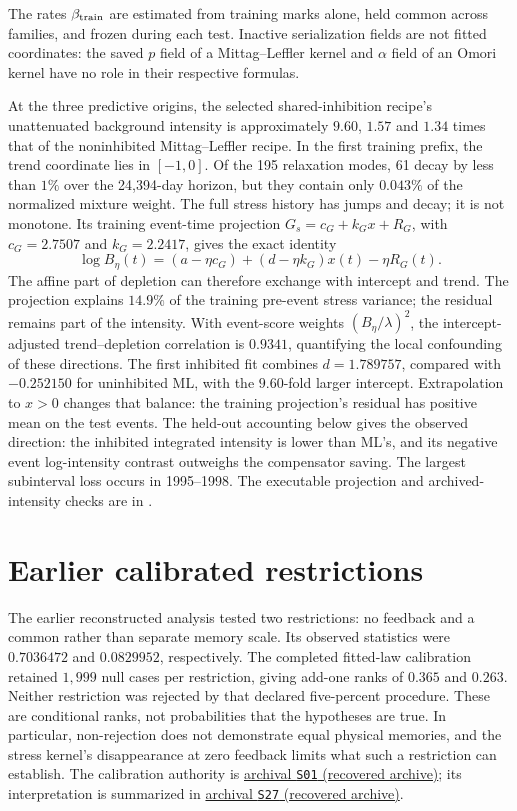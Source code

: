 The rates \(\beta_{\rm train}\) are estimated from training marks alone, held common across families, and frozen during each test. Inactive serialization fields are not fitted coordinates: the saved \(p\) field of a Mittag--Leffler kernel and \(\alpha\) field of an Omori kernel have no role in their respective formulas. 

At the three predictive origins, the selected shared-inhibition recipe's
unattenuated background intensity is approximately \(9.60\), \(1.57\)
and \(1.34\) times that of the noninhibited Mittag--Leffler recipe.
In the first training prefix, the trend coordinate lies in \([-1,0]\).
Of the 195 relaxation modes, 61 decay by less than \(1\%\) over the
24,394-day horizon, but they contain only \(0.043\%\) of the normalized
mixture weight. The full stress history has jumps and decay; it is not monotone.
Its training event-time projection \(G_s=c_G+k_Gx+R_G\), with
\(c_G=2.7507\) and \(k_G=2.2417\), gives the exact identity
\[
 \log B_\eta(t)=(a-\eta c_G)+(d-\eta k_G)x(t)-\eta R_G(t).
\]
The affine part of depletion can therefore exchange with intercept and trend.
The projection explains \(14.9\%\) of the training pre-event stress variance;
the residual remains part of the intensity. With event-score weights
\((B_\eta/\lambda)^2\), the intercept-adjusted trend--depletion correlation
is \(0.9341\), quantifying the local confounding of these directions.
The first inhibited fit combines
\(d=1.789757\), compared with \(-0.252150\) for uninhibited ML, with the
\(9.60\)-fold larger intercept. Extrapolation to \(x>0\) changes that balance:
the training projection's residual has positive mean on the test events.
The held-out accounting below gives the observed direction: the inhibited
integrated intensity is lower than ML's, and its negative event log-intensity
contrast outweighs the compensator saving. The largest subinterval loss
occurs in 1995--1998. The executable projection and archived-intensity checks
are in .

\section{Earlier calibrated restrictions}

The earlier reconstructed analysis tested two restrictions: no feedback and a common rather than separate memory scale. Its observed statistics were \(0.7036472\) and \(0.0829952\), respectively. The completed fitted-law calibration retained \(1{,}999\) null cases per restriction, giving add-one ranks of \(0.365\) and \(0.263\). Neither restriction was rejected by that declared five-percent procedure. These are conditional ranks, not probabilities that the hypotheses are true. In particular, non-rejection does not demonstrate equal physical memories, and the stress kernel's disappearance at zero feedback limits what such a restriction can establish. The calibration authority is \hyperlink{S01}{archival \texttt{S01} (recovered archive)}; its interpretation is summarized in \hyperlink{S27}{archival \texttt{S27} (recovered archive)}.

